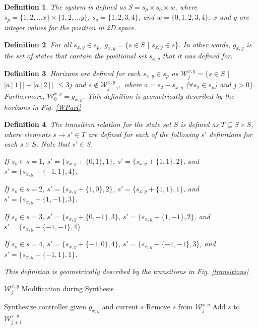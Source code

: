 \documentclass[journal]{IEEEtran}
\newtheorem{definition}{Definition}
\begin{document}
\begin{definition}
	\label{def2}
	The system is defined as $S = s_p \times s_o \times w$, where $s_p = \{1, 2, ...x\} \times \{1, 2, ...y\}$, $s_o = \{1, 2, 3, 4\}$, and $w = \{0, 1, 2, 3, 4\}$. $x$ and $y$ are integer values for the position in 2D space.
\end{definition}

\begin{definition}
	For all $s_{x,y} \in s_p$, $g_{x,y} = \{s \in S$ $|$ $s_{x,y} \in s\}$. In other words, $g_{x,y}$ is the set of states that contain the positional set $s_{x,y}$ that it was defined for.
\end{definition}

\begin{definition}
	\label{definition6}
	Horizons are defined for each $s_{x,y} \in s_p$ as $\mathcal{W}^{x,y}_j = \{s \in S$ $|$ $|a[1]| + |a[2]|$ $ \le 3j$ and $s \not \in \mathcal{W}^{x,y}_{j-1},$ where $a = s_{2} - s_{x,y}$ ($\forall s_2 \in s_p$) and $j > 0\}$. Furthermore, $\mathcal{W}^{x,y}_0 = g_{x,y}$. This definition is geometrically described by the horizons in Fig. \ref{WPart}
\end{definition}

\begin{definition}
	\label{definition7}
	The transition relation for the state set $S$ is defined as $T \subseteq S \times S$, where elements $s \to s' \in T$ are defined for each of the following $s'$ definitions for each $s \in S$. Note that $s' \in S$. 
	
	If $s_o \in s = 1$, $s' = \{s_{x,y} + \{0,1\},1\}$, $s' = \{s_{x,y} + \{1,1\},2\}$, and $s' = \{s_{x,y} + \{-1,1\},4\}$. 
	
	If $s_o \in s = 2$, $s' = \{s_{x,y} + \{1,0\},2\}$, $s' = \{s_{x,y} + \{1,1\},1\}$, and $s' = \{s_{x,y} + \{1,-1\},3\}$. 
	
	If $s_o \in s = 3$, $s' = \{s_{x,y} + \{0,-1\},3\}$, $s' = \{s_{x,y} + \{1,-1\},2\}$, and $s' = \{s_{x,y} + \{-1,-1\},4\}$. 
	
	If $s_o \in s = 4$, $s' = \{s_{x,y} + \{-1,0\},4\}$, $s' = \{s_{x,y} + \{-1,-1\},3\}$, and $s' = \{s_{x,y} + \{-1,1\},1\}$.
	
	This definition is geometrically described by the transitions in Fig. \ref{transitions}
\end{definition}

\begin{algorithm}
	\caption{$\mathcal{W}^{x,y}_j$ Modification during Synthesis}\label{alg:Wgen}
	\begin{algorithmic}[1]
		\State Synthesize controller given $g_{x,y}$ and current $s$
		\State Remove $s$ from $\mathcal{W}_j^{x,y}$
		\State Add $s$ to $\mathcal{W}_{j+1}^{x,y}$
		\EndIf
		\EndFor
		\EndFor
		\EndProcedure
	\end{algorithmic}
\end{algorithm}
\end{document}
